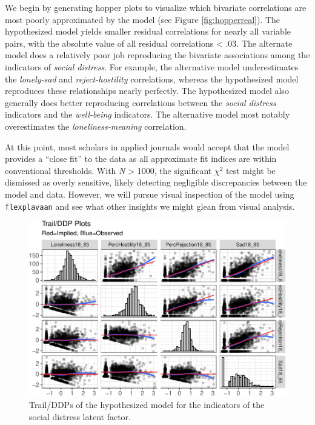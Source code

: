 \documentclass[
  english,
  man]{apa6}
\begin{document}
We begin by generating hopper plots to visualize which bivariate correlations are most poorly approximated by the model (see Figure \ref{fig:hopperreal}). The hypothesized model yields smaller residual correlations for nearly all variable pairs, with the absolute value of all residual correlations \textless{} .03. The alternate model does a relatively poor job reproducing the bivariate associations among the indicators of \emph{social distress}. For example, the alternative model underestimates the \emph{lonely-sad} and \emph{reject-hostility} correlations, whereas the hypothesized model reproduces these relationships nearly perfectly. The hypothesized model also generally does better reproducing correlations between the \emph{social distress} indicators and the \emph{well-being} indicators. The alternative model most notably overestimates the \emph{loneliness-meaning} correlation.

At this point, most scholars in applied journals would accept that the model provides a ``close fit'' to the data as all approximate fit indices are within conventional thresholds. With \emph{N} \textgreater{} 1000, the significant \(\chi^2\) test might be dismissed as overly sensitive, likely detecting negligible discrepancies between the model and data. However, we will pursue visual inspection of the model using \texttt{flexplavaan} and see what other insights we might glean from visual analysis.

\begin{figure}

{\centering \includegraphics[width=0.9\linewidth]{flexplavaan_draft_files/figure-latex/trailreal-1} 

}

\caption{Trail/DDPs of the hypothesized model for the indicators of the social distress latent factor.}\label{fig:trailreal}
\end{figure}
\end{document}
